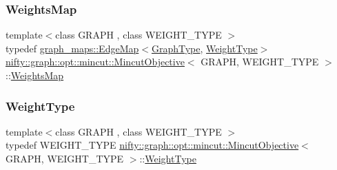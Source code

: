 \mbox{\label{classnifty_1_1graph_1_1opt_1_1mincut_1_1MincutObjective_a012cbd01da7133bf0824f41af40adafb}} 
\subsubsection{\texorpdfstring{Weights\+Map}{WeightsMap}}
{\footnotesize\ttfamily template$<$class G\+R\+A\+PH , class W\+E\+I\+G\+H\+T\+\_\+\+T\+Y\+PE $>$ \\
typedef \hyperlink{structnifty_1_1graph_1_1graph__maps_1_1EdgeMap}{graph\+\_\+maps\+::\+Edge\+Map}$<$\hyperlink{classnifty_1_1graph_1_1opt_1_1mincut_1_1MincutObjective_a3dbd0ae2a00c363dea7dcf771d0269dc}{Graph\+Type}, \hyperlink{classnifty_1_1graph_1_1opt_1_1mincut_1_1MincutObjective_aad59126994a666c8e02a71717dcffab8}{Weight\+Type}$>$ \hyperlink{classnifty_1_1graph_1_1opt_1_1mincut_1_1MincutObjective}{nifty\+::graph\+::opt\+::mincut\+::\+Mincut\+Objective}$<$ G\+R\+A\+PH, W\+E\+I\+G\+H\+T\+\_\+\+T\+Y\+PE $>$\+::\hyperlink{classnifty_1_1graph_1_1opt_1_1mincut_1_1MincutObjective_a012cbd01da7133bf0824f41af40adafb}{Weights\+Map}}

\mbox{\label{classnifty_1_1graph_1_1opt_1_1mincut_1_1MincutObjective_aad59126994a666c8e02a71717dcffab8}} 
\subsubsection{\texorpdfstring{Weight\+Type}{WeightType}}
{\footnotesize\ttfamily template$<$class G\+R\+A\+PH , class W\+E\+I\+G\+H\+T\+\_\+\+T\+Y\+PE $>$ \\
typedef W\+E\+I\+G\+H\+T\+\_\+\+T\+Y\+PE \hyperlink{classnifty_1_1graph_1_1opt_1_1mincut_1_1MincutObjective}{nifty\+::graph\+::opt\+::mincut\+::\+Mincut\+Objective}$<$ G\+R\+A\+PH, W\+E\+I\+G\+H\+T\+\_\+\+T\+Y\+PE $>$\+::\hyperlink{classnifty_1_1graph_1_1opt_1_1mincut_1_1MincutObjective_aad59126994a666c8e02a71717dcffab8}{Weight\+Type}}




